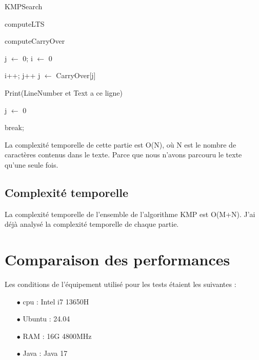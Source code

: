 \documentclass[11pt,english]{article}
\begin{document}
\begin{algorithm}[htbp]
    \SetAlFnt{\footnotesize\sf}

    \caption{KMPSearch}
    
    \Begin
    {
        computeLTS

        computeCarryOver

        j $\leftarrow$ 0; i $\leftarrow$ 0

        {
            {
               i++; j++
            }
            \Else
            {
               j $\leftarrow$ CarryOver[j]
            }  

            {
                Print(LineNumber et Text a ce ligne)
                
                j $\leftarrow$ 0

                break;
            }
        }

    }
\end{algorithm}

\pagebreak

\indent La complexité temporelle de cette partie est O(N), où N est le nombre de caractères contenus dans le texte. Parce que nous n’avons parcouru le texte qu’une seule fois.

\subsection{Complexité temporelle}

\indent 

La complexité temporelle de l'ensemble de l'algorithme KMP est O(M+N). J'ai déjà analysé la complexité temporelle de chaque partie.

\section{Comparaison des performances}

\indent

Les conditions de l'équipement utilisé pour les tests étaient les suivantes :

\begin{itemize}
    \item [$\bullet$]   cpu     :   Intel i7 13650H
    \item [$\bullet$]   Ubuntu  :   24.04
    \item [$\bullet$]   RAM     :   16G 4800MHz
    \item [$\bullet$]   Java    :   Java 17
\end{itemize}
\end{document}
